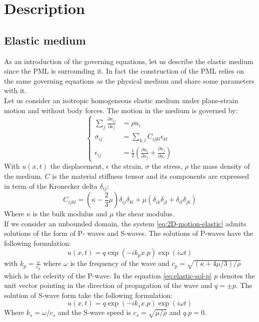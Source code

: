 \section{Description}

\subsection{Elastic medium}
As an introduction of the governing equations, let us describe the elastic medium since the PML is surrounding it. In fact the construction of the PML relies on the same governing equations as the physical medium and share some parameters with it.\\
Let us consider an isotropic homogeneous elastic medium under plane-strain motion and without body forces. The motion in the medium is governed by:
\begin{equation}
\begin{cases}
\sum_{j} \frac{\partial \sigma_{ij}}{\partial x_j} & =  \rho \ddot{u}_i \\
\sigma_{ij} &= \sum_{k,l} C_{ijkl} \epsilon_{kl} \\
\epsilon_{ij} &= \frac{1}{2} \left(\frac{\partial u_{i}}{\partial x_j} + \frac{\partial u_{j}}{\partial x_i} \right)
\end{cases}
\label{eq:2D-motion-elastic}
\end{equation} 
With $u(x,t)$ the displacement, $\epsilon$ the strain, $\sigma$ the stress, $\rho$ the mass density of the medium. $C$ is the material stiffness tensor and its components are expressed in term of the Kronecker delta $\delta_{ij}$:
\begin{equation}
C_{ijkl} = (\kappa-\frac{2}{3}\mu)\delta_{ij}\delta_{kl}+\mu(\delta_{ik}\delta_{jl} + \delta_{il} \delta_{jk})
\end{equation} 
Where $\kappa$ is the bulk modulus and $\mu$ the shear modulus.\\
If we consider an unbounded domain, the system \ref{eq:2D-motion-elastic} admits solutions of the form of P- waves and S-waves. The solutions of P-waves have the following formulation: 
\begin{equation}
u(x,t) = q \exp(-i k_p x . p) \exp(i\omega t)
\label{eq:elastic-sol-p}
\end{equation}
with $k_p = \frac{\omega}{c_p}$ where $\omega$ is the frequency of the wave and $c_p = \sqrt{(\kappa+4\mu/3)/\rho}$ which is the celerity of the P-wave. In the equation \ref{eq:elastic-sol-p} $p$ denotes the unit vector pointing in the direction of propagation of the wave and $q=\pm p$.   
The solution of S-wave form take the following formulation:
\begin{equation}
u(x,t) = q \exp(-i k_s x.p) \exp(i \omega t)
\end{equation}
Where $k_s = \omega / c_s$ and the S-wave speed is $c_s =\sqrt{ \mu/\rho}$ and $q.p =0$.
